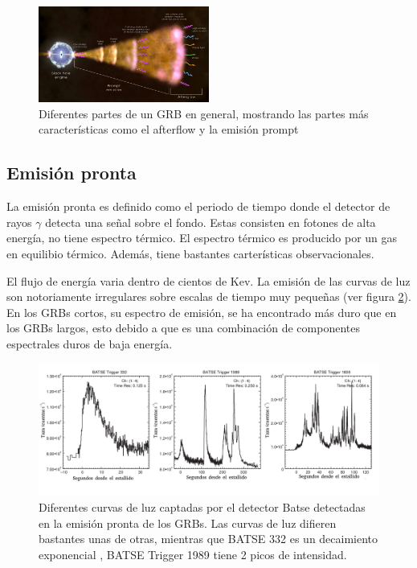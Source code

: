 \documentclass[12pt,a4paper]{book}
\begin{document}
 
 
 \begin{figure} %
  \centering
    \includegraphics[width=0.5\textwidth]{Figuras/Gamma-ray_burst_by_a_blackhole-768x432.jpg}
  \caption{Diferentes partes de un GRB en general, mostrando las partes más características como el afterflow y la emisión prompt}
  \label{fig:Partes de GRBs}
\end{figure}
 

\subsection{Emisión pronta} %
La emisión pronta es definido como el periodo de tiempo donde el detector de rayos $\gamma$ detecta una señal sobre el fondo. Estas consisten en fotones de alta energía, no tiene espectro térmico. El espectro térmico es producido por un gas en equilibio térmico. Además, tiene bastantes carterísticas observacionales.

El flujo de energía varia dentro de cientos de Kev. La emisión de las curvas de luz son notoriamente irregulares sobre escalas de tiempo muy pequeñas (ver figura \ref{lightcurve}). %
En los GRBs cortos, su espectro de emisión, se ha encontrado más duro que en los GRBs largos, esto debido a que es una combinación de componentes espectrales duros de baja energía. 

\begin{figure}
\centering %
\includegraphics[width=1.0\textwidth]{Figuras/lightcurve_different}
\caption{\label{lightcurve} Diferentes curvas de luz captadas por el detector Batse detectadas en la emisión pronta de los GRBs. Las curvas de luz difieren bastantes unas de otras, mientras que BATSE 332 es un decaimiento exponencial , BATSE Trigger 1989  tiene 2 picos de intensidad. }
\end{figure}
\end{document}
